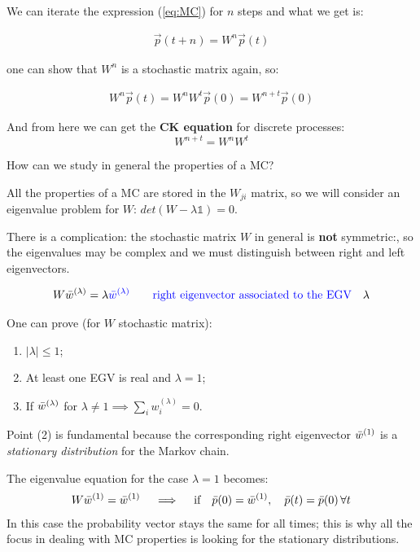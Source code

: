 \documentclass[\main/main.tex]{subfiles}
\begin{document}
We can iterate the expression (\ref{eq:MC}) for $n$ steps and what we get is: 

\begin{eqnarray}
    \Vec{p}(t+n)=W^n \Vec{p}(t)   
\end{eqnarray}

one can show that $W^n$ is a stochastic matrix again, so:

\begin{align}
    W^n \Vec{p}(t)=W^n W^t \Vec{p}(0) =W^{n+t}\Vec{p}(0)
\end{align}

And from here we can get the \textbf{CK equation} for discrete processes:
\begin{equation}
    \boxed{W^{n+t} = W^n W^t}
    \label{eq:CKMC}
\end{equation}

How can we study in general the properties of a MC?

All the properties of a MC are stored in the $W_{ji}$ matrix, so we will consider an eigenvalue problem for $W$: $det(W-\lambda \mathbb{1})=0$.

There is a complication: the stochastic matrix $W$ in general is \textbf{not} symmetric:, so the eigenvalues may be complex and we must distinguish between right and left eigenvectors.

\begin{eqnarray}
    W\Bar{w}^{(\lambda)}=\lambda \textcolor{blue}{\Bar{w}^{(\lambda)}} \qquad \text{\textcolor{blue}{right eigenvector associated to the EGV}} \quad \lambda
\end{eqnarray}

One can prove (for $W$ stochastic matrix):
\begin{enumerate}
    \item $|\lambda|\leq 1$;
    \item At least one EGV is real and $\lambda = 1$;
    \item If $\Bar{w}^{(\lambda)}$ for $\lambda\neq 1 \implies \sum_i w_i^{(\lambda)}=0$.
\end{enumerate}

Point (2) is fundamental because the corresponding right eigenvector $\Bar{w}^{(1)}$ is a \textit{stationary distribution} for the Markov chain. 

The eigenvalue equation for the case $\lambda=1$ becomes:
\begin{eqnarray}
        W\Bar{w}^{(1)}= {\Bar{w}^{(1)}}\quad \implies \quad \text{if}\quad \Bar{p}(0)=\Bar{w}^{(1)}, \quad \Bar{p}(t)=\Bar{p}(0) \, \forall t
\end{eqnarray}
In this case the probability vector stays the same for all times; this is why all the focus in dealing with MC properties is looking for the stationary distributions. \\
\end{document}
